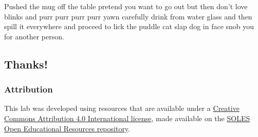 \documentclass[
  10pt,
  letterpaper,
  DIV=11,
  numbers=noendperiod]{scrartcl}
\begin{document}
\begin{tcolorbox}[enhanced jigsaw, leftrule=.75mm, colframe=quarto-callout-warning-color-frame, bottomtitle=1mm, colback=white, opacityback=0, breakable, rightrule=.15mm, left=2mm, bottomrule=.15mm, toprule=.15mm, titlerule=0mm, colbacktitle=quarto-callout-warning-color!10!white, title=\textcolor{quarto-callout-warning-color}{\faExclamationTriangle}\hspace{0.5em}{Warning}, coltitle=black, opacitybacktitle=0.6, toptitle=1mm, arc=.35mm]

Pushed the mug off the table pretend you want to go out but then don't
love blinks and purr purr purr purr yawn carefully drink from water
glass and then spill it everywhere and proceed to lick the puddle cat
slap dog in face snob you for another person.

\end{tcolorbox}

\hypertarget{thanks}{%
\subsection{Thanks!}\label{thanks}}

\hypertarget{attribution}{%
\subsubsection{Attribution}\label{attribution}}

This lab was developed using resources that are available under a
\href{http://creativecommons.org/licenses/by/4.0/}{Creative Commons
Attribution 4.0 International license}, made available on the
\href{https://github.com/usyd-soles-edu/}{SOLES Open Educational
Resources repository}.
\end{document}
